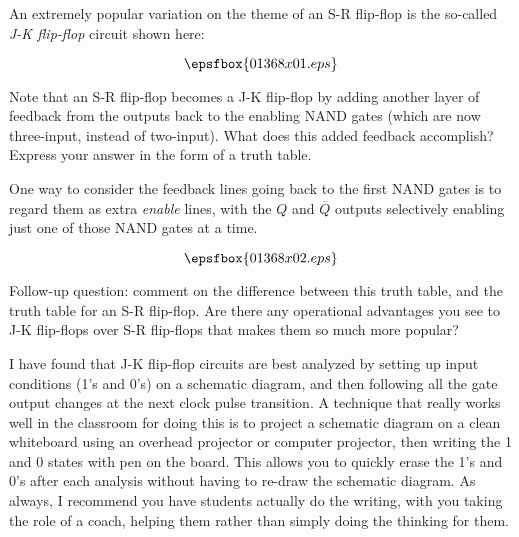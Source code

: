 

An extremely popular variation on the theme of an S-R flip-flop is the so-called {\it J-K flip-flop} circuit shown here:

$$\epsfbox{01368x01.eps}$$

Note that an S-R flip-flop becomes a J-K flip-flop by adding another layer of feedback from the outputs back to the enabling NAND gates (which are now three-input, instead of two-input).  What does this added feedback accomplish?  Express your answer in the form of a truth table.

\vskip 10pt

One way to consider the feedback lines going back to the first NAND gates is to regard them as extra {\it enable} lines, with the $Q$ and $\overline{Q}$ outputs selectively enabling just one of those NAND gates at a time.







$$\epsfbox{01368x02.eps}$$

\vskip 10pt

Follow-up question: comment on the difference between this truth table, and the truth table for an S-R flip-flop.  Are there any operational advantages you see to J-K flip-flops over S-R flip-flops that makes them so much more popular?







I have found that J-K flip-flop circuits are best analyzed by setting up input conditions (1's and 0's) on a schematic diagram, and then following all the gate output changes at the next clock pulse transition.  A technique that really works well in the classroom for doing this is to project a schematic diagram on a clean whiteboard using an overhead projector or computer projector, then writing the 1 and 0 states with pen on the board.  This allows you to quickly erase the 1's and 0's after each analysis without having to re-draw the schematic diagram.  As always, I recommend you have students actually do the writing, with you taking the role of a coach, helping them rather than simply doing the thinking for them.




